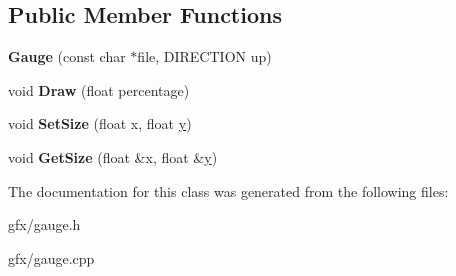 \subsection*{Public Member Functions}
\begin{DoxyCompactItemize}
\item 
{\bfseries Gauge} (const char $\ast$file, D\+I\+R\+E\+C\+T\+I\+ON up)\hypertarget{classGauge_a32e85e6c61e7abf70101f5a88475c2d1}{}\label{classGauge_a32e85e6c61e7abf70101f5a88475c2d1}

\item 
void {\bfseries Draw} (float percentage)\hypertarget{classGauge_a0d720f523759ff51f52f59e454fb8557}{}\label{classGauge_a0d720f523759ff51f52f59e454fb8557}

\item 
void {\bfseries Set\+Size} (float x, float \hyperlink{IceUtils_8h_aa7ffaed69623192258fb8679569ff9ba}{y})\hypertarget{classGauge_a77cea5ef767701abd01043b2b155f29a}{}\label{classGauge_a77cea5ef767701abd01043b2b155f29a}

\item 
void {\bfseries Get\+Size} (float \&x, float \&\hyperlink{IceUtils_8h_aa7ffaed69623192258fb8679569ff9ba}{y})\hypertarget{classGauge_a79e8fea2d426426f126f1ca65b232896}{}\label{classGauge_a79e8fea2d426426f126f1ca65b232896}

\end{DoxyCompactItemize}


The documentation for this class was generated from the following files\+:\begin{DoxyCompactItemize}
\item 
gfx/gauge.\+h\item 
gfx/gauge.\+cpp\end{DoxyCompactItemize}
